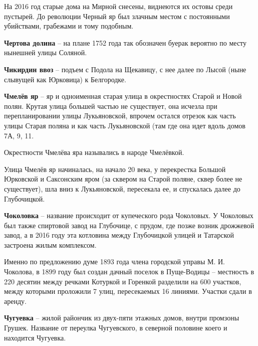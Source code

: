 На 2016 год старые дома на Мирной снесены, виднеются их остовы среди пустырей. До революции Черный яр был злачным местом с постоянными убийствами, грабежами и тому подобным.\\

\medskip

\textbf{Чертова долина} – на плане 1752 года так обозначен буерак вероятно по месту нынешней улицы Соляной.\\

\medskip

\textbf{Чикирдин ввоз} – подъем с Подола на Щекавицу, с нее далее по Лысой (ныне слывущей как Юрковица) к Белгородке.\\

\medskip



\textbf{Чмелёв яр} – яр и одноименная старая улица в окрестностях Старой и Новой полян. Крутая улица большей частью не существует, она исчезла при перепланировании улицы Лукьяновской, впрочем остался отрезок как часть улицы Старая поляна и как часть Лукьяновской (там где она идет вдоль домов 7А, 9, 11.

Окрестности Чмелёва яра назывались в народе Чмелёвкой.

Улица Чмелёв яр начиналась, на начало 20 века, у перекрестка Большой Юрковской и Саксонским яром (за сквером на Старой поляне, сквер более не существует), шла вниз к Лукьяновской, пересекала ее, и спускалась далее до Глубочицкой.\\


\medskip

\textbf{Чоколовка} – название происходит от купеческого рода Чоколовых. У Чоколовых был также спиртовой завод на Глубочице, с прудом, где позже возник дрожжевой завод, а в 2016 году эта котловина между Глубочицкой улицей и Татарской застроена жилым комплексом.

Именно по предложению думе 1893 года члена городской управы М. И. Чоколова, в 1899 году был создан дачный поселок в Пуще-Водицы – местность в 220 десятин между речками Котуркой и Горенкой разделили на 600 участков, между которыми проложили 7 улиц, пересекаемых 16 линиями. Участки сдали в аренду.\\

\medskip


\textbf{Чугуевка} – жилой райончик из двух-пяти этажных домов, внутри промзоны Грушек. Название от переулка Чугуевского, в северной половине коего и находится Чугуевка.